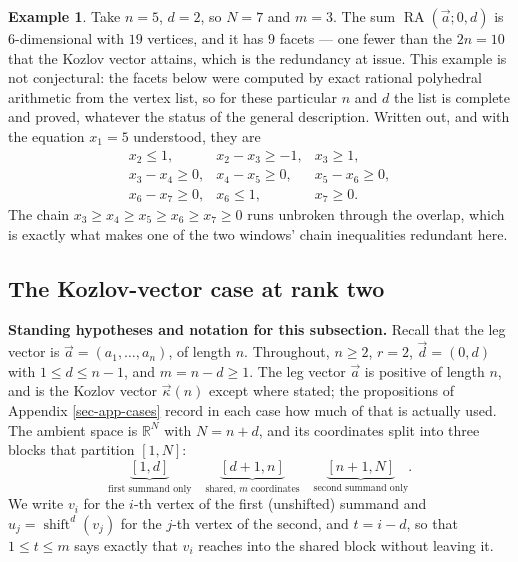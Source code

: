 \documentclass[11pt, a4paper, abstract=yes]{scrartcl}
\theoremstyle{definition}
\newtheorem{mexample}[definition]{Example}
\theoremstyle{remark}
\theoremstyle{plain}
\newcommand{\shift}{\operatorname{shift}}
\newcommand{\RA}{\operatorname{RA}}
\newcommand{\kozvec}{\vec\kappa}
\begin{document}
\begin{mexample}
Take \(n=5\), \(d=2\), so \(N=7\) and \(m=3\). The sum \(\RA(\vec a;0,d)\) is \(6\)-dimensional
with \(19\)
vertices, and it has \(9\) facets --- one fewer than the \(2n=10\) that the Kozlov vector attains,
which is the redundancy at issue. This example is not conjectural: the facets below were computed
by exact rational polyhedral arithmetic from the vertex list, so for these particular \(n\) and
\(d\) the list is complete and proved, whatever the status of the general description. Written out,
and with the equation \(x_1=5\) understood, they are
\[
\begin{array}{lll}
 x_2\le 1, & x_2-x_3\ge-1, & x_3\ge 1,\\
 x_3-x_4\ge 0, & x_4-x_5\ge 0, & x_5-x_6\ge 0,\\
 x_6-x_7\ge 0, & x_6\le 1, & x_7\ge 0 .
\end{array}
\]
The chain \(x_3\ge x_4\ge x_5\ge x_6\ge x_7\ge0\) runs unbroken through the overlap, which is
exactly what makes one of the two windows' chain inequalities redundant here.
\label{ex-ones-facets}
\end{mexample}
\subsection{The Kozlov-vector case at rank two}
\label{sec:orga9db6d8}

\textbf{Standing hypotheses and notation for this subsection.} Recall that the leg vector is
\(\vec a=(a_1,\dots,a_n)\), of length \(n\). Throughout, \(n\ge2\), \(r=2\),
\(\vec d=(0,d)\) with \(1\le d\le n-1\), and \(m=n-d\ge1\). The leg vector \(\vec a\) is positive of
length \(n\), and is the Kozlov vector \(\kozvec(n)\) except where stated; the propositions of
Appendix \ref{sec-app-cases} record in each case how much of that is actually used. The
ambient space is \(\mathbb R^N\) with \(N=n+d\), and its coordinates split into three blocks that
partition \([1,N]\):
\begin{equation}\label{eq:ones-facets}
  \underbrace{[1,d]}_{\text{first summand only}}\quad
  \underbrace{[d+1,n]}_{\text{shared, }m\text{ coordinates}}\quad
  \underbrace{[n+1,N]}_{\text{second summand only}} .
\end{equation}
We write \(v_i\) for the \(i\)-th vertex of the first (unshifted) summand and
\(u_j=\shift^d(v_j)\) for the \(j\)-th vertex of the second, and \(t=i-d\), so that
\(1\le t\le m\) says exactly that \(v_i\) reaches into the shared block without leaving it.
\end{document}
